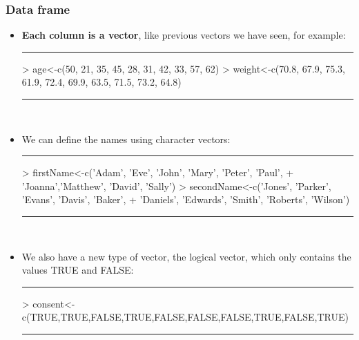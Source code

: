 \documentclass{beamer}
\begin{document}
\begin{frame}[fragile]
	\frametitle{Data frame}
	\begin{itemize}
		\small
		\item \textbf{Each column is a vector}, like previous vectors we have seen, for example:
\rule{\textwidth}{0.4pt}
\scriptsize
\begin{Schunk}
\begin{Sinput}
> age<-c(50, 21, 35, 45, 28, 31, 42, 33, 57, 62)
> weight<-c(70.8, 67.9, 75.3, 61.9, 72.4, 69.9, 63.5, 71.5, 73.2, 64.8)
\end{Sinput}
\end{Schunk}
\rule{\textwidth}{0.4pt}\\
\small
\vspace{10pt}
		\item We can define the names using character vectors:
\rule{\textwidth}{0.4pt}
\scriptsize
\begin{Schunk}
\begin{Sinput}
> firstName<-c('Adam', 'Eve', 'John', 'Mary', 'Peter', 'Paul', 
+ 	     'Joanna','Matthew', 'David', 'Sally')
> secondName<-c('Jones', 'Parker', 'Evans', 'Davis', 'Baker', 
+ 	       'Daniels', 'Edwards', 'Smith', 'Roberts', 'Wilson')
\end{Sinput}
\end{Schunk}
\rule{\textwidth}{0.4pt}\\
\small
\vspace{10pt}
		\item We also have a new type of vector, the logical vector, which only contains the values TRUE and FALSE:
\rule{\textwidth}{0.4pt}
\scriptsize
\begin{Schunk}
\begin{Sinput}
> consent<-c(TRUE,TRUE,FALSE,TRUE,FALSE,FALSE,FALSE,TRUE,FALSE,TRUE)
\end{Sinput}
\end{Schunk}
\rule{\textwidth}{0.4pt}\\\end{itemize}
\end{frame}
\end{document}
